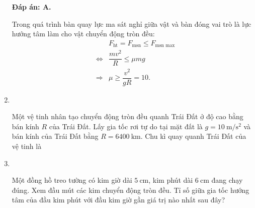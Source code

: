 \begin{enumerate}[label=\bfseries Câu \arabic*:,leftmargin=1.5cm]
	\hideall
	{	\textbf{Đáp án: A.}
		
	Trong quá trình bàn quay lực ma sát nghỉ giữa vật và bàn đóng vai trò là lực hướng tâm làm cho vật chuyển động tròn đều:
\begin{eqnarray*}
	&&F_\text{ht}=F_\text{msn}\le F_\text{msn max}\\
	&\Leftrightarrow& \dfrac{mv^2}{R}\le \mu mg\\
	&\Rightarrow& \mu \ge \dfrac{v^2}{gR}=10.
\end{eqnarray*}

	}
	
	
	\item {}\\
	{Một vệ tinh nhân tạo chuyển động tròn đều quanh Trái Đất ở độ cao bằng bán kính $R$ của Trái Đất. Lấy gia tốc rơi tự do tại mặt đất là $g=\SI{10}{\meter/\second^2}$ và bán kính của Trái Đất bằng $R=\SI{6400}{\kilo\meter}$. Chu kì quay quanh Trái Đất của vệ tinh là
	
}

\item {}\\
{Một đồng hồ treo tường có kim giờ dài $\SI{5}{\centi\meter}$, kim phút dài $\SI{6}{\centi\meter}$ đang chạy đúng. Xem đầu mút các kim chuyển động tròn đều. Tỉ số giữa gia tốc hướng tâm của đầu kim phút với đầu kim giờ gần giá trị nào nhất sau đây?
}


\end{enumerate}

